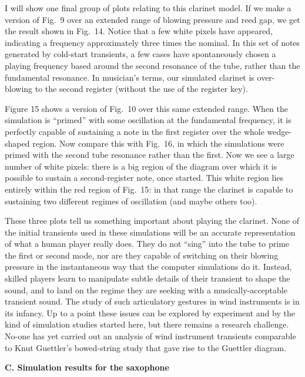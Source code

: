   I will show one final group of plots relating to this clarinet model. If we 
  make a version of Fig.\ 9 over an extended range of blowing pressure and reed 
  gap, we get the result shown in Fig.\ 14. Notice that a few white pixels have 
  appeared, indicating a frequency approximately three times the nominal. In 
  this set of notes generated by cold-start transients, a few cases have 
  spontaneously chosen a playing frequency based around the second resonance of 
  the tube, rather than the fundamental resonance. In musician's terms, our 
  simulated clarinet is over-blowing to the second register (without the use of 
  the register key). 

  Figure 15 shows a version of Fig.\ 10 over this same extended range. When the 
  simulation is “primed” with some oscillation at the fundamental frequency, it 
  is perfectly capable of sustaining a note in the first register over the 
  whole wedge-shaped region. Now compare this with Fig.\ 16, in which the 
  simulations were primed with the second tube resonance rather than the first. 
  Now we see a large number of white pixels: there is a big region of the 
  diagram over which it is possible to sustain a second-register note, once 
  started. This white region lies entirely within the red region of Fig.\ 15: 
  in that range the clarinet is capable to sustaining two different regimes of 
  oscillation (and maybe others too). 

  These three plots tell us something important about playing the clarinet. 
  None of the initial transients used in these simulations will be an accurate 
  representation of what a human player really does. They do not “sing” into 
  the tube to prime the first or second mode, nor are they capable of switching 
  on their blowing pressure in the instantaneous way that the computer 
  simulations do it. Instead, skilled players learn to manipulate subtle 
  details of their transient to shape the sound, and to land on the regime they 
  are seeking with a musically-acceptable transient sound. The study of such 
  articulatory gestures in wind instruments is in its infancy. Up to a point 
  these issues can be explored by experiment and by the kind of simulation 
  studies started here, but there remains a research challenge. No-one has yet 
  carried out an analysis of wind instrument transients comparable to Knut 
  Guettler’s bowed-string study that gave rise to the Guettler diagram. 

  \textbf{C. Simulation results for the saxophone} 

